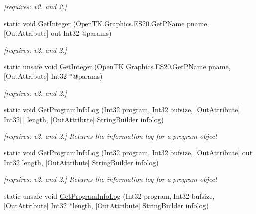\begin{DoxyCompactItemize}
\begin{DoxyCompactList}\small\item\em \mbox{[}requires\-: v2. and 2.\mbox{]}\end{DoxyCompactList}\item 
static void \hyperlink{class_open_t_k_1_1_graphics_1_1_e_s20_1_1_g_l_ad570eeb4a331dc511357503fbaef2447}{Get\-Integer} (Open\-T\-K.\-Graphics.\-E\-S20.\-Get\-P\-Name pname, \mbox{[}Out\-Attribute\mbox{]} out Int32 @params)
\begin{DoxyCompactList}\small\item\em \mbox{[}requires\-: v2. and 2.\mbox{]}\end{DoxyCompactList}\item 
static unsafe void \hyperlink{class_open_t_k_1_1_graphics_1_1_e_s20_1_1_g_l_a99f70ddd979e2ca986c643816108b44a}{Get\-Integer} (Open\-T\-K.\-Graphics.\-E\-S20.\-Get\-P\-Name pname, \mbox{[}Out\-Attribute\mbox{]} Int32 $\ast$@params)
\begin{DoxyCompactList}\small\item\em \mbox{[}requires\-: v2. and 2.\mbox{]}\end{DoxyCompactList}\item 
static void \hyperlink{class_open_t_k_1_1_graphics_1_1_e_s20_1_1_g_l_a68284fd383c087fdedb61fc0c3a48a1a}{Get\-Program\-Info\-Log} (Int32 program, Int32 bufsize, \mbox{[}Out\-Attribute\mbox{]} Int32\mbox{[}$\,$\mbox{]} length, \mbox{[}Out\-Attribute\mbox{]} String\-Builder infolog)
\begin{DoxyCompactList}\small\item\em \mbox{[}requires\-: v2. and 2.\mbox{]} Returns the information log for a program object \end{DoxyCompactList}\item 
static void \hyperlink{class_open_t_k_1_1_graphics_1_1_e_s20_1_1_g_l_a07943a485e1084be2d79e78a0fc119cc}{Get\-Program\-Info\-Log} (Int32 program, Int32 bufsize, \mbox{[}Out\-Attribute\mbox{]} out Int32 length, \mbox{[}Out\-Attribute\mbox{]} String\-Builder infolog)
\begin{DoxyCompactList}\small\item\em \mbox{[}requires\-: v2. and 2.\mbox{]} Returns the information log for a program object \end{DoxyCompactList}\item 
static unsafe void \hyperlink{class_open_t_k_1_1_graphics_1_1_e_s20_1_1_g_l_a2fddf31b452ede5fc4d6169a5f48fe9d}{Get\-Program\-Info\-Log} (Int32 program, Int32 bufsize, \mbox{[}Out\-Attribute\mbox{]} Int32 $\ast$length, \mbox{[}Out\-Attribute\mbox{]} String\-Builder infolog)

\end{DoxyCompactItemize}
